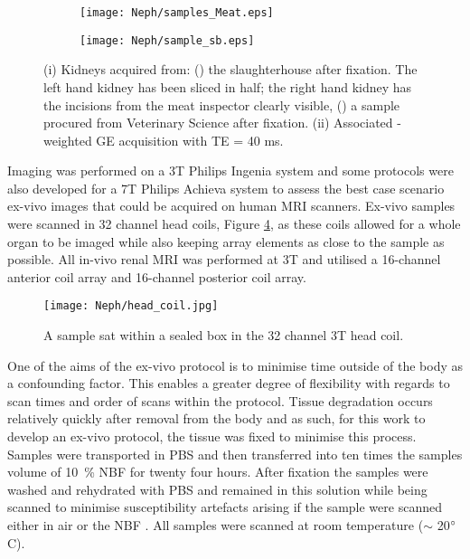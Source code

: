\begin{figure}[H]
	\centering
	\begin{subfigure}[c]{0.47\textwidth}
		\centering
		\texttt{[image: Neph/samples\_Meat.eps]}
		\caption{}
		\label{fig:ex_samples_meat}
	\end{subfigure}
	\hfill
	\begin{subfigure}[c]{0.47\textwidth}
		\centering
		\texttt{[image: Neph/sample\_sb.eps]}
		\caption{}
		\label{fig:ex_samples_sb}
	\end{subfigure}
	\caption{(i) Kidneys acquired from: () the slaughterhouse after fixation. The left hand kidney has been sliced in half; the right hand kidney has the incisions from the meat inspector clearly visible, () a sample procured from Veterinary Science after fixation. (ii) Associated \ttwo-weighted \ac*{GE} acquisition with TE = 40 ms.}
	\label{fig:ex_samples}
\end{figure}

Imaging was performed on a 3T Philips Ingenia system and some protocols were also developed for a 7T Philips Achieva system to assess the best case scenario ex-vivo images that could be acquired on human \ac{MRI} scanners. Ex-vivo samples were scanned in 32 channel head coils, Figure \ref{fig:ex_head_coil}, as these coils allowed for a whole organ to be imaged while also keeping array elements as close to the sample as possible. All in-vivo renal \ac{MRI} was performed at 3T and utilised a 16-channel anterior coil array and 16-channel posterior coil array.

\begin{figure}[H]
	\centering
	\texttt{[image: Neph/head\_coil.jpg]}
	\caption{A sample sat within a sealed box in the 32 channel 3T head coil.}
	\label{fig:ex_head_coil}	
\end{figure}

One of the aims of the ex-vivo protocol is to minimise time outside of the body as a confounding factor. This enables a greater degree of flexibility with regards to scan times and order of scans within the protocol. Tissue degradation occurs relatively quickly after removal from the body and as such, for this work to develop an ex-vivo protocol, the tissue was fixed to minimise this process. Samples were transported in \acf{PBS} and then transferred into ten times the samples volume of 10~\% \acf{NBF} for twenty four hours. After fixation the samples were washed and rehydrated with \ac{PBS} and remained in this solution while being scanned to minimise susceptibility artefacts arising if the sample were scanned either in air or the \ac{NBF} \cite{sengupta_high_2017}. All samples were scanned at room temperature ($\sim$ 20$\degree$C).


